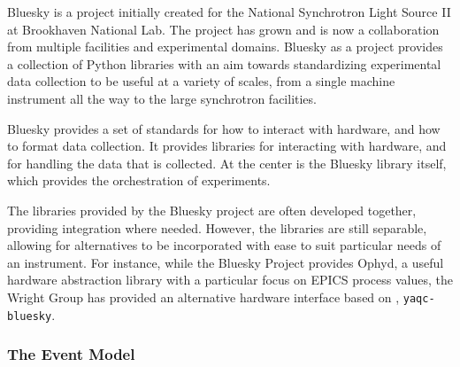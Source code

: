 
Bluesky is a project initially created for the National Synchrotron Light Source II at Brookhaven National Lab.
The project has grown and is now a collaboration from multiple facilities and experimental domains.
Bluesky as a project provides a collection of Python libraries with an aim towards standardizing experimental data collection to be useful at a variety of scales, from a single machine instrument all the way to the large synchrotron facilities.

Bluesky provides a set of standards for how to interact with hardware, and how to format data collection.
It provides libraries for interacting with hardware, and for handling the data that is collected.
At the center is the Bluesky library itself, which provides the orchestration of experiments.


The libraries provided by the Bluesky project are often developed together, providing integration where needed.
However, the libraries are still separable, allowing for alternatives to be incorporated with ease to suit particular needs of an instrument.
For instance, while the Bluesky Project provides Ophyd\cite{}, a useful hardware abstraction library with a particular focus on EPICS process values, the Wright Group has provided an alternative hardware interface based on \yaq, \texttt{yaqc-bluesky}\cite{}.

\subsubsection{The Event Model}


